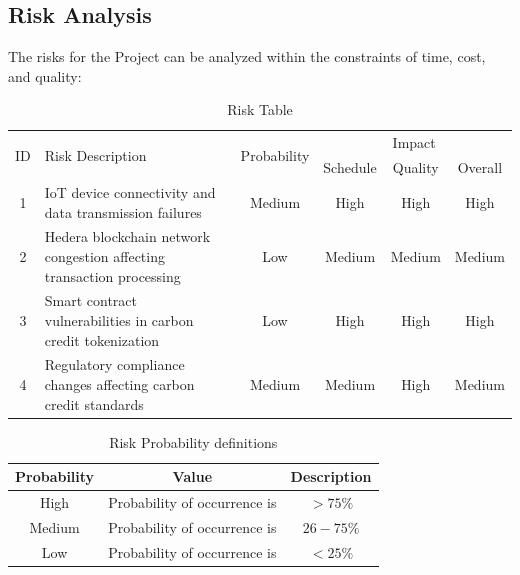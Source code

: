 \documentclass[oneside,a4paper,12pt]{book}
\renewcommand{\arraystretch}{1.4}
\begin{document}
\subsection{Risk Analysis}
The risks for the Project can be analyzed within the constraints of time, cost, and quality:

\begin{table}[!htbp]
\begin{center}
\def\arraystretch{1.5}
\begin{tabularx}{\textwidth}{| c | X | c | c | c | c |}
\hline
\multirow{2}{*}{ID} & \multirow{2}{*}{Risk Description}	& \multirow{2}{*}{Probability} & \multicolumn{3}{|c|}{Impact} \\ \cline{4-6}
	& & &	Schedule	& Quality	& Overall \\ \hline
1	& IoT device connectivity and data transmission failures	& Medium	& High  & High	& High \\ \hline
2	& Hedera blockchain network congestion affecting transaction processing	& Low	& Medium	& Medium	& Medium \\ \hline
3	& Smart contract vulnerabilities in carbon credit tokenization	& Low	& High	& High	& High \\ \hline
4	& Regulatory compliance changes affecting carbon credit standards	& Medium	& Medium	& High	& Medium \\ \hline
\end{tabularx}
\end{center}
\caption{Risk Table}
\label{tab:risk}
\end{table}

\begin{table}[!htbp]
\begin{center}
\def\arraystretch{1.5}
\begin{tabular}{| c | c | c |}
\hline
Probability & Value &	Description \\ \hline
High &	Probability of occurrence is &  $ > 75 \% $ \\ \hline
Medium &	Probability of occurrence is  & $26-75 \% $ \\ \hline
Low	& Probability of occurrence is & $ < 25 \% $ \\ \hline
\end{tabular}
\end{center}
\caption{Risk Probability definitions}
\label{tab:riskdef}
\end{table}
\end{document}
